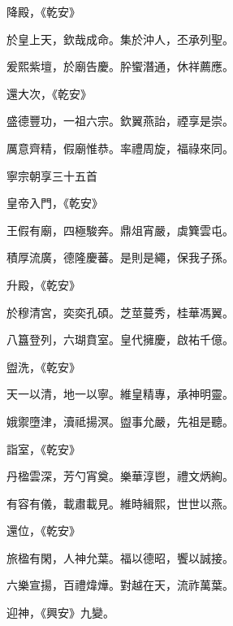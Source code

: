 \begin{pinyinscope}
 降殿，《乾安》



 於皇上天，欽哉成命。集於沖人，丕承列聖。



 爰熙紫壇，於廟告慶。肸蠁潛通，休祥薦應。



 還大次，《乾安》



 盛德豐功，一祖六宗。欽翼燕詒，禋享是崇。



 厲意齊精，假廟惟恭。率禮周旋，福祿來同。



 寧宗朝享三十五首



 皇帝入門，《乾安》



 王假有廟，四極駿奔。鼎俎宵嚴，虡簨雲屯。



 積厚流廣，德隆慶蕃。是則是繩，保我子孫。



 升殿，《乾安》



 於穆清宮，奕奕孔碩。芝莖蔓秀，桂華馮翼。



 八簋登列，六瑚賁室。皇代擁慶，啟祐千億。



 盥洗，《乾安》



 天一以清，地一以寧。維皇精專，承神明靈。



 娥禦墮津，瀆祗揚溟。盥事允嚴，先祖是聽。



 詣室，《乾安》



 丹楹雲深，芳勺宵奠。樂華淳鬯，禮文炳絢。



 有容有儀，載肅載見。維時緝熙，世世以燕。



 還位，《乾安》



 旅楹有閑，人神允葉。福以德昭，饗以誠接。



 六樂宣揚，百禮煒燁。對越在天，流祚萬葉。



 迎神，《興安》九變。




\end{pinyinscope}
